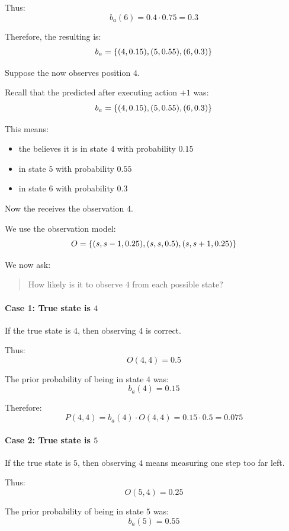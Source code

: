 Thus:
\[
b_a(6)
=
0.4\cdot 0.75
=
0.3
\]

Therefore, the resulting  is:
\[
b_a
=
\left\{
(4,0.15),
(5,0.55),
(6,0.3)
\right\}
\]

Suppose the  now observes position $4$.

Recall that the predicted  after executing action $+1$ was:
\[
b_a
=
\left\{
(4,0.15),
(5,0.55),
(6,0.3)
\right\}
\]

This means:
\begin{itemize}
    \item the  believes it is in state $4$ with probability $0.15$
    \item in state $5$ with probability $0.55$
    \item in state $6$ with probability $0.3$
\end{itemize}

Now the  receives the observation $4$.

We use the observation model:
\[
O
=
\left\{
(s,s-1,0.25),
(s,s,0.5),
(s,s+1,0.25)
\right\}
\]

We now ask:

\begin{quote}
How likely is it to observe $4$ from each possible state?
\end{quote}

\paragraph{Case 1: True state is $4$}

If the true state is $4$, then observing $4$ is correct.

Thus:
\[
O(4,4)=0.5
\]

The prior probability of being in state $4$ was:
\[
b_a(4)=0.15
\]

Therefore:
\[
P(4,4)
=
b_a(4)\cdot O(4,4)
=
0.15\cdot 0.5
=
0.075
\]

\paragraph{Case 2: True state is $5$}

If the true state is $5$, then observing $4$ means measuring one step too far left.

Thus:
\[
O(5,4)=0.25
\]

The prior probability of being in state $5$ was:
\[
b_a(5)=0.55
\]

